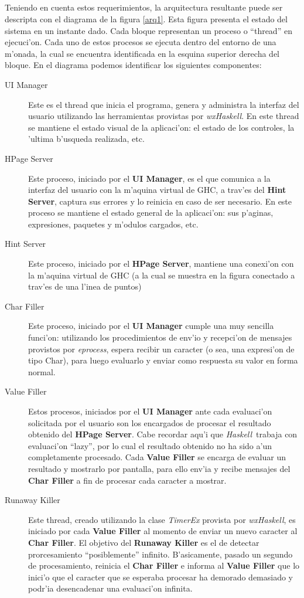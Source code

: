 \documentclass[a4paper]{article}
\newcommand{\haskell}{\textsl{Haskell}}
\begin{document}
\subparagraph{}Teniendo en cuenta estos requerimientos, la arquitectura resultante puede ser descripta con el diagrama de la figura \ref{arq1}.  Esta figura presenta el estado del sistema en un instante dado.  Cada bloque representan un proceso o ``thread'' en ejecuci'on.  Cada uno de estos procesos se ejecuta dentro del entorno de una m'onada, la cual se encuentra identificada en la esquina superior derecha del bloque.  En el diagrama podemos identificar los siguientes componentes:
\begin{description}
	\item[UI Manager] Este es el thread que inicia el programa, genera y administra la interfaz del usuario utilizando las herramientas provistas por \textsl{wxHaskell}.  En este thread se mantiene el estado visual de la aplicaci'on: el estado de los controles, la 'ultima b'usqueda realizada, etc.
	\item[HPage Server] Este proceso, iniciado por el \textbf{UI Manager}, es el que comunica a la interfaz del usuario con la m'aquina virtual de GHC, a trav'es del \textbf{Hint Server}, captura sus errores y lo reinicia en caso de ser necesario.  En este proceso se mantiene el estado general de la aplicaci'on: sus p'aginas, expresiones, paquetes y m'odulos cargados, etc.
	\item[Hint Server] Este proceso, iniciado por el \textbf{HPage Server}, mantiene una conexi'on con la m'aquina virtual de GHC (a la cual se muestra en la figura conectado a trav'es de una l'inea de puntos)
	\item[Char Filler] Este proceso, iniciado por el \textbf{UI Manager} cumple una muy sencilla funci'on: utilizando los procedimientos de env'io y recepci'on de mensajes provistos por \textsl{eprocess}, espera recibir un caracter (o sea, una expresi'on de tipo Char), para luego evaluarlo y enviar como respuesta su valor en forma normal.
	\item[Value Filler] Estos procesos, iniciados por el \textbf{UI Manager} ante cada evaluaci'on solicitada por el usuario son los encargados de procesar el resultado obtenido del \textbf{HPage Server}. Cabe recordar aqu'i que \haskell\ trabaja con evaluaci'on ``lazy'', por lo cual el resultado obtenido no ha sido a'un completamente procesado.  Cada \textbf{Value Filler} se encarga de evaluar un resultado y mostrarlo por pantalla, para ello env'ia y recibe mensajes del \textbf{Char Filler} a fin de procesar cada caracter a mostrar.
	\item[Runaway Killer] Este thread, creado utilizando la clase \textsl{TimerEx} provista por \textsl{wxHaskell}, es iniciado por cada \textbf{Value Filler} al momento de enviar un nuevo caracter al \textbf{Char Filler}.  El objetivo del \textbf{Runaway Killer} es el de detectar prorcesamiento ``posiblemente'' infinito.  B'asicamente, pasado un segundo de procesamiento, reinicia el \textbf{Char Filler} e informa al \textbf{Value Filler} que lo inici'o que el caracter que se esperaba procesar ha demorado demasiado y podr'ia desencadenar una evaluaci'on infinita.
\end{description}
\end{document}
